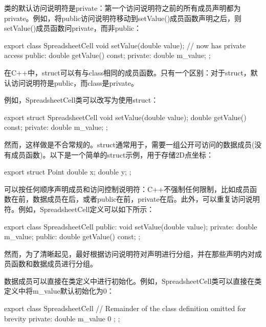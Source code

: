 类的默认访问说明符是private：第一个访问说明符之前的所有成员声明都为private。例如，将public访问说明符移动到setValue()成员函数声明之后，则setValue()成员函数问private，而非public：

\begin{cpp}
export class SpreadsheetCell
{
        void setValue(double value); // now has private access
    public:
        double getValue() const;
    private:
        double m_value;
};
\end{cpp}

在C++中，struct可以有与class相同的成员函数。只有一个区别：对于struct，默认访问说明符是public，而class是private。

例如，SpreadsheetCell类可以改写为使用struct：

\begin{cpp}
export struct SpreadsheetCell
{
    void setValue(double value);
        double getValue() const;
    private:
        double m_value;
};
\end{cpp}

然而，这样做是不合常规的。struct通常用于，需要一组公开可访问的数据成员(没有成员函数)。以下是一个简单的struct示例，用于存储2D点坐标：

\begin{cpp}
export struct Point
{
    double x;
    double y;
};
\end{cpp}


可以按任何顺序声明成员和访问控制说明符：C++不强制任何限制，比如成员函数在前，数据成员在后，或者public在前，private在后。此外，可以重复访问说明符。例如，SpreadsheetCell定义可以如下所示：

\begin{cpp}
export class SpreadsheetCell
{
    public:
        void setValue(double value);
    private:
        double m_value;
    public:
        double getValue() const;
};
\end{cpp}

然而，为了清晰起见，最好根据访问说明符对声明进行分组，并在那些声明内对成员函数和数据成员进行分组。


数据成员可以直接在类定义中进行初始化。例如，SpreadsheetCell类可以直接在类定义中将m\_value默认初始化为0：

\begin{cpp}
export class SpreadsheetCell
{
    // Remainder of the class definition omitted for brevity
    private:
        double m_value { 0 };
};
\end{cpp}

